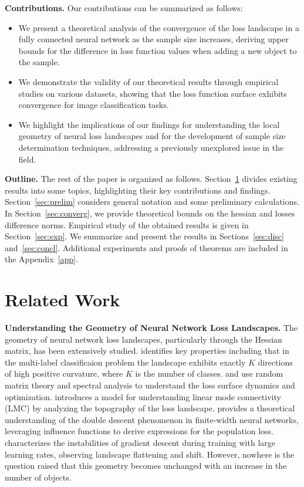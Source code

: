 \documentclass{article}
\begin{document}
\textbf{Contributions.} Our contributions can be summarized as follows:
\begin{itemize}
    \item We present a theoretical analysis of the convergence of the loss landscape in a fully connected neural network as the sample size increases, deriving upper bounds for the difference in loss function values when adding a new object to the sample.
    \item We demonstrate the validity of our theoretical results through empirical studies on various datasets, showing that the loss function surface exhibits convergence for image classification tasks.
    \item We highlight the implications of our findings for understanding the local geometry of neural loss landscapes and for the development of sample size determination techniques, addressing a previously unexplored issue in the field.
\end{itemize}

\textbf{Outline.} The rest of the paper is organized as follows. Section~\ref{sec:rw} divides existing results into some topics, highlighting their key contributions and findings. Section~\ref{sec:prelim} considers general notation and some preliminary calculations. In Section~\ref{sec:converg}, we provide theoretical bounds on the hessian and losses difference norms. Empirical study of the obtained results is given in Section~\ref{sec:exp}. We summarize and present the results in Sections~\ref{sec:disc} and~\ref{sec:concl}. Additional experiments and proofs of theorems are included in the Appendix~\ref{app}.

\section{Related Work}\label{sec:rw}

\textbf{Understanding the Geometry of Neural Network Loss Landscapes.}
The geometry of neural network loss landscapes, particularly through the Hessian matrix, has been extensively studied. \cite{fort2019emergentpropertieslocalgeometry} identifies key properties including that in the multi-label classificaion problem the landscape exhibits exactly $K$ directions of high positive curvature, where $K$ is the number of classes. \cite{pmlr-v70-pennington17a} and \cite{pmlr-v97-ghorbani19b} use random matrix theory and spectral analysis to understand the loss surface dynamics and optimization. \cite{singh2024landscapinglinearmodeconnectivity} introduces a model for understanding linear mode connectivity (LMC) by analyzing the topography of the loss landscape. \cite{singh2022phenomenologydoubledescentfinitewidth} provides a theoretical understanding of the double descent phenomenon in finite-width neural networks, leveraging influence functions to derive expressions for the population loss. \cite{wang2023instabilitieslargelearningrate} characterizes the instabilities of gradient descent during training with large learning rates, observing landscape flattening and shift. However, nowhere is the question raised that this geometry becomes unchanged with an increase in the number of objects.
\end{document}
